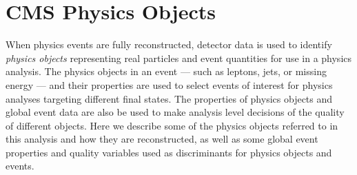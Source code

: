 \section{CMS Physics Objects}
\label{sec:physicsobjects}

When physics events are fully reconstructed, detector data is used to identify {\it physics objects} representing real particles and event quantities for use in a physics analysis. The physics objects in an event --- such as leptons, jets, or missing energy --- and their properties are used to select events of interest for physics analyses targeting different final states. The properties of physics objects and global event data are also be used to make analysis level decisions of the quality of different objects. Here we describe some of the physics objects referred to in this analysis and how they are reconstructed, as well as some global event properties and quality variables used as discriminants for physics objects and events.

